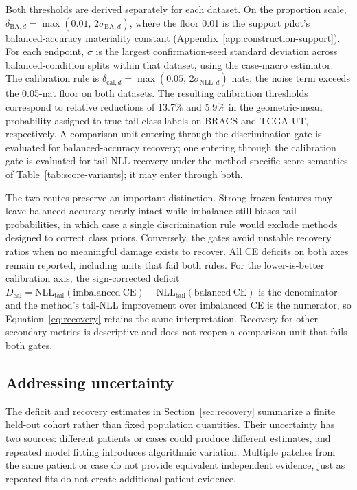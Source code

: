 \documentclass[11pt]{article}
\begin{document}
Both thresholds are derived separately for each dataset. On the proportion scale, $\delta_{\mathrm{BA},d}=\max(0.01,\,2\sigma_{\mathrm{BA},d})$, where the floor \num{0.01} is the support pilot's balanced-accuracy materiality constant (Appendix~\ref{app:construction-support}). For each endpoint, $\sigma$ is the largest confirmation-seed standard deviation across balanced-condition splits within that dataset, using the case-macro estimator. The calibration rule is $\delta_{\mathrm{cal},d}=\max(0.05,\,2\sigma_{\mathrm{NLL},d})$ nats; the noise term exceeds the \num{0.05}-nat floor on both datasets. The resulting calibration thresholds correspond to relative reductions of \num{13.7}\% and \num{5.9}\% in the geometric-mean probability assigned to true tail-class labels on BRACS and TCGA-UT, respectively. A comparison unit entering through the discrimination gate is evaluated for balanced-accuracy recovery; one entering through the calibration gate is evaluated for tail-NLL recovery under the method-specific score semantics of Table~\ref{tab:score-variants}; it may enter through both.

The two routes preserve an important distinction. Strong frozen features may leave balanced accuracy nearly intact while imbalance still biases tail probabilities, in which case a single discrimination rule would exclude methods designed to correct class priors. Conversely, the gates avoid unstable recovery ratios when no meaningful damage exists to recover. All CE deficits on both axes remain reported, including units that fail both rules. For the lower-is-better calibration axis, the sign-corrected deficit $D_{\mathrm{cal}}=\mathrm{NLL}_{\mathrm{tail}}(\mathrm{imbalanced\ CE})-\mathrm{NLL}_{\mathrm{tail}}(\mathrm{balanced\ CE})$ is the denominator and the method's tail-NLL improvement over imbalanced CE is the numerator, so Equation~\eqref{eq:recovery} retains the same interpretation. Recovery for other secondary metrics is descriptive and does not reopen a comparison unit that fails both gates.

\subsection{Addressing uncertainty}
The deficit and recovery estimates in Section~\ref{sec:recovery} summarize a finite held-out cohort rather than fixed population quantities. Their uncertainty has two sources: different patients or cases could produce different estimates, and repeated model fitting introduces algorithmic variation. Multiple patches from the same patient or case do not provide equivalent independent evidence, just as repeated fits do not create additional patient evidence.
\end{document}
